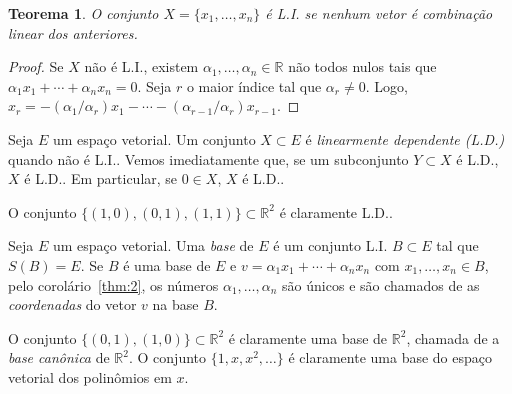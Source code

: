 \documentclass[12pt,a4paper]{article}
\newcommand{\R}{\mathbb{R}}
\newtheorem{thm}{Teorema}[section]
\theoremstyle{definition}
\begin{document}
\begin{thm}
  O conjunto $X=\{x_1,\ldots,x_n\}$ é L.I. se nenhum vetor é
  combinação linear dos anteriores.
\end{thm}
\begin{proof}
  Se $X$ não é L.I., existem $\alpha_1,\ldots,\alpha_n\in\R$ não todos
  nulos tais que $\alpha_1x_1+\cdots+\alpha_nx_n=0$. Seja $r$ o maior
  índice tal que $\alpha_r\ne 0$. Logo,
  $x_r=-(\alpha_1/\alpha_r)x_1-\cdots-(\alpha_{r-1}/\alpha_r)x_{r-1}$.
\end{proof}

Seja $E$ um espaço vetorial. Um conjunto $X\subset E$ é
\textit{linearmente dependente (L.D.)}  quando não é L.I.. Vemos
imediatamente que, se um subconjunto $Y\subset X$ é L.D., $X$ é
L.D.. Em particular, se $0\in X$, $X$ é L.D..

O conjunto $\{(1,0), (0,1), (1,1)\}\subset \R^2$ é claramente L.D..

Seja $E$ um espaço vetorial. Uma \textit{base} de $E$ é um conjunto
L.I.  $B\subset E$ tal que $S(B)=E$. Se $B$ é uma base de $E$ e
$v=\alpha_1x_1+\cdots+\alpha_nx_n$ com $x_1,\ldots,x_n\in B$, pelo
corolário~\ref{thm:2}, os números $\alpha_1,\ldots,\alpha_n$ são
únicos e são chamados de as \textit{coordenadas} do vetor $v$ na base
$B$.

O conjunto $\{(0,1),(1,0)\}\subset \R^2$ é claramente uma base de
$\R^2$, chamada de a \textit{base canônica} de $\R^2$. O conjunto
$\{1,x,x^2,\ldots\}$ é claramente uma base do espaço vetorial dos
polinômios em $x$.
\end{document}
